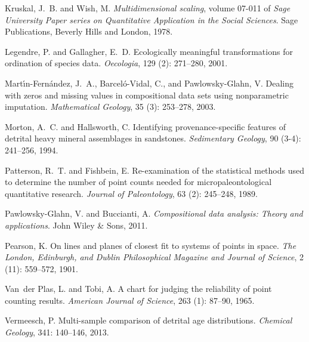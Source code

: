 \documentclass{article}
\begin{document}
\begin{thebibliography}{32}
Kruskal, J.~B. and Wish, M.
\newblock \emph{Multidimensional scaling}, volume 07-011 of \emph{Sage
  University Paper series on Quantitative Application in the Social Sciences}.
\newblock Sage Publications, Beverly Hills and London, 1978.

Legendre, P. and Gallagher, E.~D.
\newblock Ecologically meaningful transformations for ordination of species
  data.
\newblock \emph{Oecologia}, 129 (2): 271--280, 2001.

Mart{\'\i}n-Fern{\'a}ndez, J.~A., Barcel{\'o}-Vidal, C., and Pawlowsky-Glahn,
  V.
\newblock Dealing with zeros and missing values in compositional data sets
  using nonparametric imputation.
\newblock \emph{Mathematical Geology}, 35 (3): 253--278,
  2003.

Morton, A.~C. and Hallsworth, C.
\newblock Identifying provenance-specific features of detrital heavy mineral
  assemblages in sandstones.
\newblock \emph{Sedimentary Geology}, 90 (3-4): 241--256,
  1994.

Patterson, R.~T. and Fishbein, E.
\newblock Re-examination of the statistical methods used to determine the
  number of point counts needed for micropaleontological quantitative research.
\newblock \emph{Journal of Paleontology}, 63 (2): 245--248,
  1989.

Pawlowsky-Glahn, V. and Buccianti, A.
\newblock \emph{{Compositional data analysis: Theory and applications}}.
\newblock John Wiley \& Sons, 2011.

Pearson, K.
\newblock On lines and planes of closest fit to systems of points in space.
\newblock \emph{The London, Edinburgh, and Dublin Philosophical Magazine and
  Journal of Science}, 2 (11): 559--572, 1901.

Van~der Plas, L. and Tobi, A.
\newblock A chart for judging the reliability of point counting results.
\newblock \emph{American Journal of Science}, 263 (1):
  87--90, 1965.

Vermeesch, P.
\newblock Multi-sample comparison of detrital age distributions.
\newblock \emph{Chemical Geology}, 341: 140--146, 2013.


\end{thebibliography}
\end{document}
